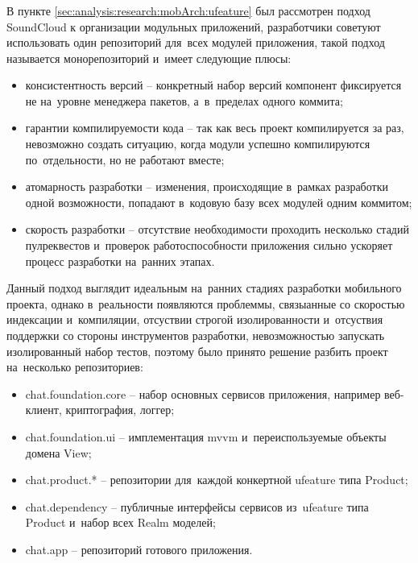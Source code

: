 \subsubsection{}
\label{sec:development:arch:ios:ufeature}

В пункте \ref{sec:analysis:research:mobArch:ufeature} был рассмотрен подход SoundCloud к организации модульных приложений, разработчики советуют использовать один репозиторий для~всех модулей приложения, такой подход называется монорепозиторий и~имеет следующие плюсы:

\begin{itemize}
\item консистентность версий -- конкретный набор версий компонент фиксируется не на~уровне менеджера пакетов, а~в~пределах одного коммита;
\item гарантии компилируемости кода -- так как весь проект компилируется за раз, невозможно создать ситуацию, когда модули успешно компилируются по~отдельности, но не работают вместе;
\item атомарность разработки -- изменения, происходящие в~рамках разработки одной возможности, попадают в~кодовую базу всех модулей одним коммитом;
\item скорость разработки -- отсутствие необходимости проходить несколько стадий пулреквестов и~проверок работоспособности приложения сильно ускоряет процесс разработки на~ранних этапах.
\end{itemize}

Данный подход выглядит идеальным на~ранних стадиях разработки мобильного проекта, однако в~реальности появляются проблеммы, связыанные со скоростью индексации и~компиляции, отсуствии строгой изолированности и~отсуствия поддержки со стороны инструментов разработки, невозможностью запускать изолированный набор тестов, поэтому было принято решение разбить проект на~несколько репозиториев:

\begin{itemize}
\item chat.foundation.core -- набор основных сервисов приложения, например веб-клиент, криптография, логгер;
\item chat.foundation.ui -- имплементация \gls{mvvm} и~переиспользуемые объекты домена View;
\item chat.product.* -- репозитории для~каждой конкертной \gls{ufeature} типа Product;
\item chat.dependency -- публичные интерфейсы сервисов из~\gls{ufeature} типа Product и~набор всех Realm моделей;
\item chat.app -- репозиторий готового приложения.
\end{itemize}

